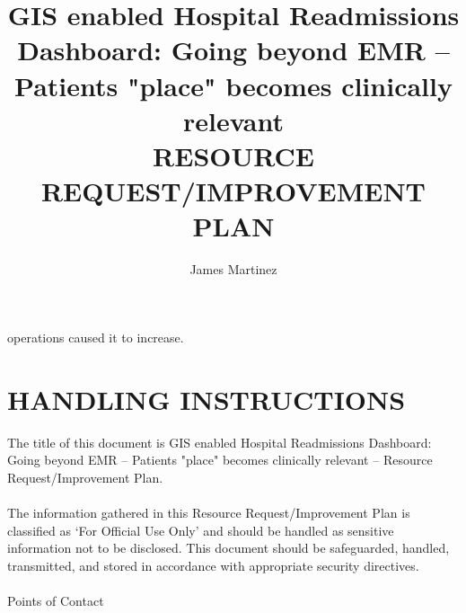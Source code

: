 \documentclass[11pt]{article}\usepackage[]{graphicx}\usepackage[]{color}
\title{GIS enabled Hospital Readmissions Dashboard:
 Going beyond EMR – Patients "place" becomes clinically relevant\\
\smallskip
  \large RESOURCE REQUEST/IMPROVEMENT PLAN\\ }
\author{James Martinez}
\begin{document}
\maketitle
\newpage	
\tableofcontents
\newpage	


operations caused it to increase.

\section{HANDLING INSTRUCTIONS}

The title of this document is GIS enabled Hospital Readmissions Dashboard: Going beyond EMR – Patients "place" becomes clinically relevant – Resource Request/Improvement Plan.
\paragraph{}

The information gathered in this Resource Request/Improvement Plan is classified as ‘For Official Use Only’ and should be handled as sensitive information not to be disclosed. This document should be safeguarded, handled, transmitted, and stored in accordance with appropriate security directives.
\paragraph{}
Points of Contact
\paragraph{}
\end{document}
